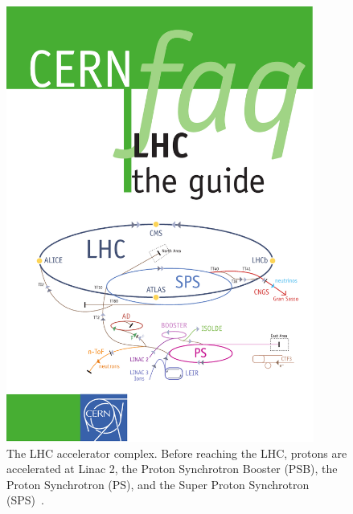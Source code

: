 \begin{figure}[tp]
  \centering
  \includegraphics[width=0.90\textwidth]{figures/lhc-atlas/lhc-accelerator-complex}
  \caption{The LHC accelerator complex. Before reaching the LHC, protons are accelerated at Linac 2, the Proton Synchrotron Booster (PSB), the Proton Synchrotron (PS), and the Super Proton Synchrotron (SPS)~\cite{cern-faq}.}
  \label{fig:lhc-complex}
\end{figure}

